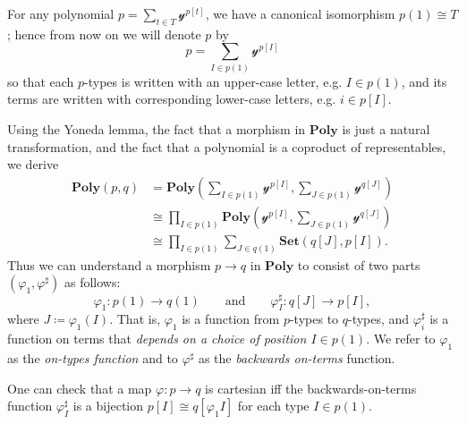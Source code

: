 \documentclass[11pt, one side, article]{memoir}
\theoremstyle{definition}
\theoremstyle{plain}
\newenvironment{remark}
  {\pushQED{\qed}\renewcommand{\qedsymbol}{$\lozenge$}\remarkx}
  {\popQED\endremarkx}
\newcommand{\Cat}[1]{\mathbf{#1}}%
\newcommand{\smset}{\Cat{Set}}
\newcommand{\yon}{\mathcal{y}}
\newcommand{\poly}{\Cat{Poly}}
\newcommand{\0}{\textsf{0}}
\newcommand{\1}{\tn{\textsf{1}}}
\newcommand{\qqand}{\qquad\text{and}\qquad}
\begin{document}
For any polynomial $p=\sum_{t\in T}\yon^{p[t]}$, we have a canonical isomorphism $p(1)\cong T$; hence from now on we will denote $p$ by
\begin{equation}\label{eqn.poly_notation}
p=\sum_{I\in p(1)}\yon^{p[I]}
\end{equation}
so that each $p$-types is written with an upper-case letter, e.g. $I\in p(1)$, and its terms are written with corresponding lower-case letters, e.g. $i\in p[I]$.

\begin{remark}\label{rem.positions_and_directions}
Using the Yoneda lemma, the fact that a morphism in $\poly$ is just a natural transformation, and the fact that a polynomial is a coproduct of representables, we derive
\begin{align*}
	\poly(p,q)&=
	\poly\left(\sum_{I\in p(1)}\yon^{p[I]},\sum_{J\in p(1)}\yon^{q[J]}\right)\\&\cong
	\prod_{I\in p(1)}\poly\left(\yon^{p[I]},\sum_{J\in p(1)}\yon^{q[J]}\right)\\&\cong
	\prod_{I\in p(1)}\sum_{J\in q(1)}\smset(q[J],p[I]).
\end{align*}
Thus we can understand a morphism $p\to q$ in $\poly$ to consist of two parts $(\varphi_1,\varphi^\sharp)$ as follows:
\begin{equation}\label{eqn.mapsharp}
  \varphi_1\colon p(1)\to q(1)
  \qqand
  \varphi^\sharp_I\colon q[J]\to p[I],
\end{equation}
where $J\coloneqq\varphi_1(I)$. That is, $\varphi_1$ is a function from $p$-types to $q$-types, and $\varphi^\sharp_i$ is a function on terms that \emph{depends on a choice of position $I\in p(1)$}. We refer to $\varphi_1$ as the \emph{on-types function} and to $\varphi^\sharp$ as the \emph{backwards on-terms} function. 

One can check that a map $\varphi\colon p\to q$ is cartesian iff the backwards-on-terms function $\varphi^\sharp_I$ is a bijection $p[I]\cong q[\varphi_1I]$ for each type $I\in p(1)$.
\end{remark}
\end{document}
